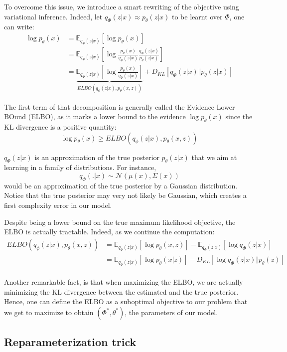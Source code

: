 To overcome this issue, we introduce a smart rewriting of the objective using variational
inference.
Indeed, let $q_{\Phi}(z|x) \approx p_{\theta}(z|x)$ to be learnt over $\Phi$, one can write:
$$
\begin{align}
    \log p_{\theta}(x) &= \mathbb{E}_{q_{\Phi}(z|x)}[\log p_{\theta}(x)] \\
    &= \mathbb{E}_{q_{\Phi}(z|x)}\left[\log \frac{p_{\theta}(x)}{q_{\Phi}(z|x)} \frac{q_{\Phi}(z|x)}{p_{\theta}(z|x)}\right]
    \\
    &= \underbrace{\mathbb{E}_{q_{\Phi}(z|x)} \left[\log \frac{p_{\theta}(x)}{q_{\Phi}(z|x)}\right]}_{ELBO(q_\phi(z|x), p_{\theta}(x,z))} + D_{KL}\left[q_{\Phi}(z|x) \Vert p_{\theta}(z|x)\right]
\end{align}
$$

The first term of that decomposition is generally called the Evidence Lower BOund (ELBO),
as it marks a lower bound to the evidence $\log p_{\theta}(x)$ since the KL divergence is a
positive quantity:
$$
\log p_{\theta}(x) \ge ELBO(q_\phi(z|x), p_{\theta}(x,z))
$$

$q_{\Phi}(z|x)$ is an approximation of the true posterior $p_{\theta}(z|x)$ that we aim at
learning in a family of distributions. For instance,
$$
q_{\Phi}(.|x) \sim \mathcal{N}(\mu(x), \Sigma(x))
$$ 
would be an approximation of the true posterior by a Gaussian distribution.
Notice that the true posterior may very not likely be Gaussian, which creates a first
complexity error in our model.

Despite being a lower bound on the true maximum likelihood objective, the ELBO is actually tractable. Indeed, as we continue the computation:
$$
\begin{align}
    ELBO(q_\phi(z|x), p_{\theta}(x,z)) &= \mathbb{E}_{q_{\Phi}(z|x)}[\log p_{\theta}(x,z)] - \mathbb{E}_{q_{\Phi}(z|x)}[\log q_{\Phi}(z|x)] \\
    &= 
\mathbb{E}_{q_{\Phi}(z|x)}[\log p_{\theta}(x|z)] - D_{KL}[\log q_{\Phi}(z|x) \Vert p_{\theta}(z)] \\\end{align}
$$

Another remarkable fact, is that when maximizing the ELBO, we are actually minimizing the KL divergence between the estimated and the true posterior.
Hence, one can define the ELBO as a suboptimal objective to our problem that we get to maximize to obtain $(\Phi^*, \theta^*)$, the parameters of our model.

\subsection{Reparameterization trick}


